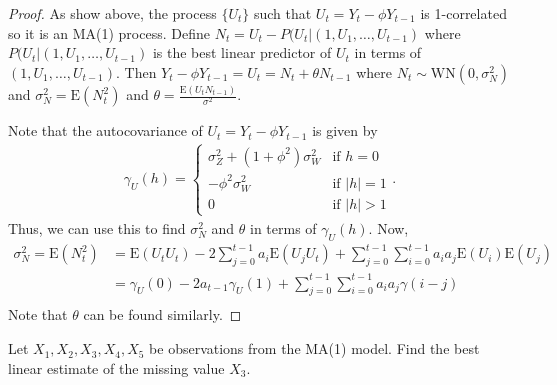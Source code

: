 \documentclass[12pt]{article}
\theoremstyle{definition}
\newenvironment{custompbm}[1]
  {\renewcommand\theproblem{#1}\problem}
  {\endproblem}
\newcommand{\E}{\text{E}}
\begin{document}
\begin{proof}
  As show above, the process $\{U_t\}$ such that $U_t = Y_t - \phi Y_{t-1}$ is
  1-correlated so it is an MA(1) process. Define $N_t = U_t - P(U_t|(1, U_1, \dots, U_{t-1})$ where
  $P(U_t|(1, U_1, \dots, U_{t-1})$ is the best linear predictor of $U_t$ in terms of
  $(1, U_1, \dots, U_{t-1})$. Then $Y_t - \phi Y_{t-1} = U_t = N_t + \theta N_{t-1}$ where $N_t \sim \text{WN}(0, \sigma_N^2)$
  and $\sigma_N^2 = \E(N_t^2)$ and $\theta = \frac{\E(U_tN_{t-1})}{\sigma^2}$.

  Note that the autocovariance of $U_t = Y_t - \phi Y_{t-1}$ is given by
  \begin{align*}
  \gamma_U(h) =
  \begin{cases}
    \sigma_Z^2 + (1 + \phi^2)\sigma_W^2 & \text{if $h = 0$} \\
    -\phi^2\sigma_W^2 & \text{if $|h| = 1$} \\
    0 & \text{if $|h| > 1$}
  \end{cases}.
  \end{align*}
  Thus, we can use this to find $\sigma_N^2$ and $\theta$ in terms of $\gamma_U(h)$.
  Now,
  \begin{align*}
    \sigma_N^2 = \E(N_t^2) &= \E(U_tU_t) - 2 \sum_{j=0}^{t-1} a_i \E(U_jU_t) + \sum_{j=0}^{t-1}\sum_{i=0}^{t-1}a_i a_j \E(U_i)\E(U_j)\\
    &= \gamma_U(0) - 2a_{t-1} \gamma_U(1) + \sum_{j=0}^{t-1}\sum_{i=0}^{t-1}a_i a_j \gamma(i-j)\\
  \end{align*}
  Note that $\theta$ can be found similarly.
\end{proof}

\begin{custompbm}{4.a}
  Let $X_1, X_2, X_3, X_4, X_5$ be observations from the MA(1) model.
  Find the best linear estimate of the missing value $X_3$.
\end{custompbm}
\end{document}
